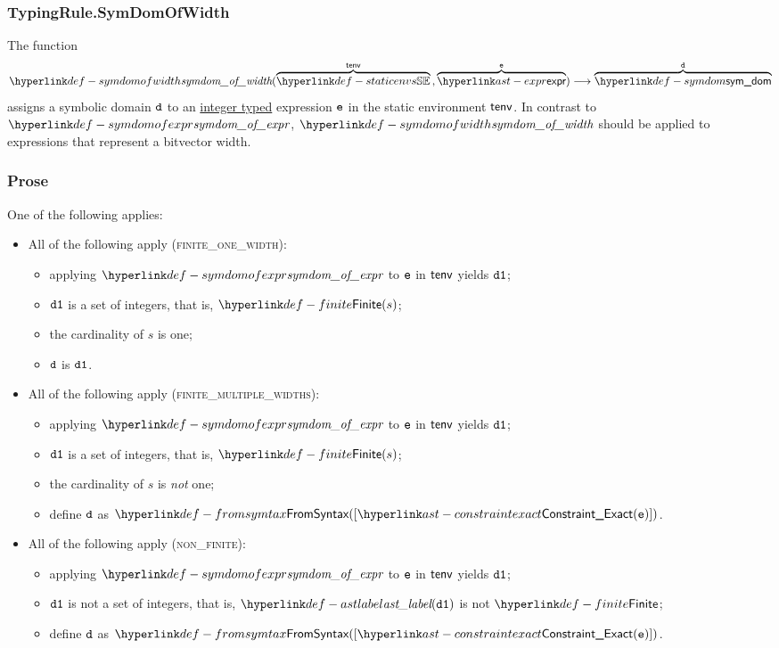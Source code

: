 \subsubsection{TypingRule.SymDomOfWidth \label{sec:TypingRule.SymDomOfWidth}}
\hypertarget{def-symdomofwidth}{}
The function
\[
\symdomofwidth(
  \overname{\staticenvs}{\tenv} \aslsep
  \overname{\expr}{\ve}
) \aslto
\overname{\symdom}{\vd}
\]
assigns a symbolic domain $\texttt{d}$ to an \underline{integer typed} expression $\texttt{e}$ in the static environment $\textsf{tenv}$.
In contrast to $\symdomofexpr$, $\symdomofwidth$ should be applied to expressions that represent a bitvector width.

\subsubsection{Prose}
One of the following applies:
\begin{itemize}
  \item All of the following apply (\textsc{finite\_one\_width}):
  \begin{itemize}
    \item applying $\symdomofexpr$ to $\texttt{e}$ in $\textsf{tenv}$ yields $\texttt{d1}$;
    \item $\texttt{d1}$ is a set of integers, that is, $\Finite(s)$;
    \item the cardinality of $s$ is one;
    \item $\texttt{d}$ is $\texttt{d1}$.
  \end{itemize}

  \item All of the following apply (\textsc{finite\_multiple\_widths}):
  \begin{itemize}
    \item applying $\symdomofexpr$ to $\texttt{e}$ in $\textsf{tenv}$ yields $\texttt{d1}$;
    \item $\texttt{d1}$ is a set of integers, that is, $\Finite(s)$;
    \item the cardinality of $s$ is \emph{not} one;
    \item define $\texttt{d}$ as $\FromSyntax([\ConstraintExact(\ve)])$.
  \end{itemize}

  \item All of the following apply (\textsc{non\_finite}):
  \begin{itemize}
    \item applying $\symdomofexpr$ to $\texttt{e}$ in $\textsf{tenv}$ yields $\texttt{d1}$;
    \item $\texttt{d1}$ is not a set of integers, that is, $\astlabel(\vdone)$ is not $\Finite$;
    \item define $\texttt{d}$ as $\FromSyntax([\ConstraintExact(\ve)])$.
  \end{itemize}
\end{itemize}

